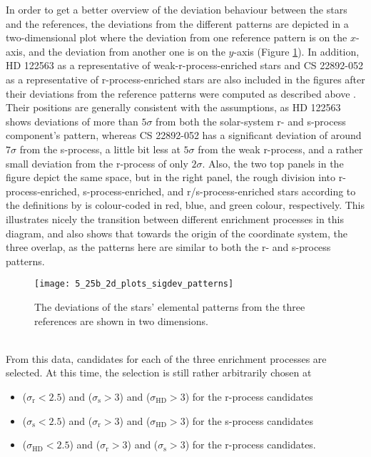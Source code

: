 \documentclass[a4paper,11pt]{article}
\begin{document}
In order to get a better overview of the deviation behaviour between the stars and the references, the deviations from the different patterns are depicted in a two-dimensional plot where the deviation from one reference pattern is on the $x$-axis, and the deviation from another one is on the $y$-axis (Figure \ref{fig:2d_plots_sigdev_patterns}). In addition, HD 122563 as a representative of weak-r-process-enriched stars and CS 22892-052 as a representative of r-process-enriched stars are also included in the figures after their deviations from the reference patterns were computed as described above \citep[for the abundances used for CS 22892-052, see][]{sneden03}. Their positions are generally consistent with the assumptions, as HD 122563 shows deviations of more than $5\sigma$ from both the solar-system r- and s-process component's pattern, whereas CS 22892-052 has a significant deviation of around $7\sigma$ from the s-process, a little bit less at $5\sigma$ from the weak r-process, and a rather small deviation from the r-process of only $2\sigma$. Also, the two top panels in the figure depict the same space, but in the right panel, the rough division into r-process-enriched, s-process-enriched, and r/s-process-enriched stars according to the definitions by \citet{beers05} is colour-coded in red, blue, and green colour, respectively. This illustrates nicely the transition between different enrichment processes in this diagram, and also shows that towards the origin of the coordinate system, the three overlap, as the patterns here are similar to both the r- and s-process patterns.
%
\begin{figure}[ht]
 \centering
 \texttt{[image: 5\_25b\_2d\_plots\_sigdev\_patterns]}
 \caption[2D plot of deviations from different elemental patterns]{The deviations of the stars' elemental patterns from the three references are shown in two dimensions.}
 \label{fig:2d_plots_sigdev_patterns}
\end{figure}\\
%
From this data, candidates for each of the three enrichment processes are selected. At this time, the selection is still rather arbitrarily chosen at
%
\begin{itemize}
 \item ($\sigma_\mathrm{r}<2.5$) and ($\sigma_\mathrm{s}>3$) and ($\sigma_\mathrm{HD}>3$) for the r-process candidates
 \item ($\sigma_\mathrm{s}<2.5$) and ($\sigma_\mathrm{r}>3$) and ($\sigma_\mathrm{HD}>3$) for the s-process candidates
 \item ($\sigma_\mathrm{HD}<2.5$) and ($\sigma_\mathrm{r}>3$) and ($\sigma_\mathrm{s}>3$) for the r-process candidates.
\end{itemize}
\end{document}
